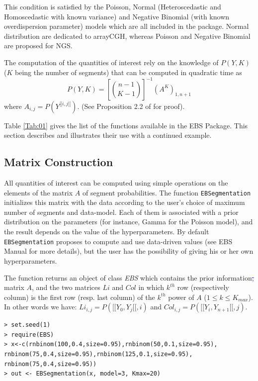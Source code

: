\documentclass{bioinfo}
\newcommand{\SR}[2]{{\textcolor{blue}{\sout{#1}{#2}}}}
\begin{document}
\begin{methods}
This condition is satisfied by the Poisson,
Normal (Heteroscedastic and Homoscedastic with known variance) and
Negative Binomial (with known overdispersion parameter) models which are all included in the
  package. Normal distribution are dedicated to arrayCGH, whereas
Poisson and Negative Binomial are proposed for NGS.

The computation of the quantities of interest rely on the knowledge of $P(Y,K)$
($K$ being the number of segments) that can be computed in quadratic
time as
\begin{equation}
 P(Y,K) = \left[{n-1} \choose{K-1} \right]^{-1} \left(A^K \right)_{1,n+1} \label{Proba}
\end{equation} 
where $A_{i,j}=P(Y^{[\![i,j[\![})$. (See Proposition 2.2
                of \cite{rigaill_exact_2011} for proof). \newline


Table \ref{Tab:01} gives the list of the functions available in the EBS Package. This section describes and illustrates their use with a continued example. 

\subsection{Matrix Construction}

All quantities of interest can be computed using simple operations on the elements of the matrix $A$ of segment probabilities. The function \texttt{EBSegmentation} initializes this matrix with the data according to the user's choice of maximum number of segments and data-model. Each of them is associated with a prior distribution on the parameters (for instance, Gamma for the Poisson model), and the result depends on the value of the hyperparameters. By default \texttt{EBSegmentation} proposes to compute and use data-driven values (see EBS Manual for more details), but the user has the possibility of giving his or her own hyperparameters.

The function returns an object of class \textit{EBS} which contains
the prior information\SR{,}{} matrix $A$, and the two matrices $Li$
and $Col$ in which $k^{th}$ row (respectively column) is the first row
(resp. last column) of the $k^{th}$ power of $A$ ($1\leq k \leq
K_{max}$).  In other words we have: $Li_{i,j}=P([\![Y_0,Y_j[\![,i)$
        and $Col_{i,j}=P([\![Y_i,Y_{n+1}[\![,j)$.

\begin{verbatim}
> set.seed(1)
> require(EBS)
> x<-c(rnbinom(100,0.4,size=0.95),rnbinom(50,0.1,size=0.95),
rnbinom(75,0.4,size=0.95),rnbinom(125,0.1,size=0.95),
rnbinom(75,0.4,size=0.95))
> out <- EBSegmentation(x, model=3, Kmax=20)
\end{verbatim}



\end{methods}
\end{document}
